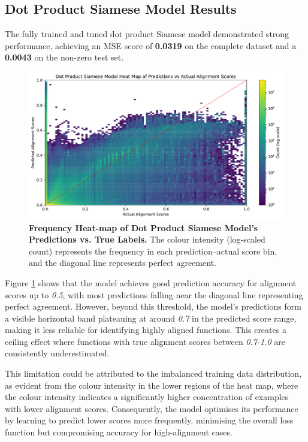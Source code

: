\subsection{Dot Product Siamese Model Results}
The fully trained and tuned dot product Siamese model demonstrated strong performance, achieving an MSE score of \textbf{0.0319} on the complete dataset and a \textbf{0.0043} on the non-zero test set.

\begin{figure}[tbh!]
\centering
\includegraphics[scale=0.65]{Figures/Dot_Product_Siamese_Model_Heatmap.pdf}
\caption{\textbf{Frequency Heat‑map of Dot Product Siamese Model's Predictions vs. True Labels.} The colour intensity (log‑scaled count) represents the frequency in each prediction–actual score bin, and the diagonal line represents perfect agreement.} 
\label{fig:SiameseModelHeatmap}
\end{figure}

Figure \ref{fig:SiameseModelHeatmap} shows that the model achieves good prediction accuracy for alignment scores up to \textit{0.5}, with most predictions falling near the diagonal line representing perfect agreement. However, beyond this threshold, the model's predictions form a visible horizontal band plateauing at around \textit{0.7} in the predicted score range, making it less reliable for identifying highly aligned functions. This creates a ceiling effect where functions with true alignment scores between \textit{0.7-1.0} are consistently underestimated.

This limitation could be attributed to the imbalanced training data distribution, as evident from the colour intensity in the lower regions of the heat map, where the colour intensity indicates a significantly higher concentration of examples with lower alignment scores. Consequently, the model optimises its performance by learning to predict lower scores more frequently, minimising the overall loss function but compromising accuracy for high-alignment cases.

